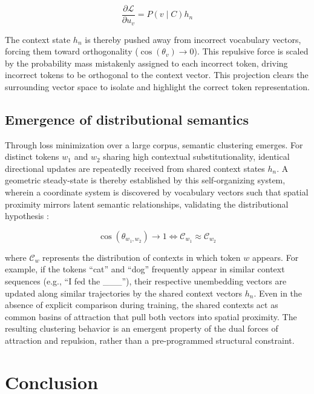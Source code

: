 \documentclass[11pt,a4paper]{article}
\begin{document}
	\begin{equation}
		\frac{\partial \mathcal{L}}{\partial u_v} = P(v \mid C) h_n
	\end{equation}
	
	The context state $h_n$ is thereby pushed away from incorrect vocabulary vectors, forcing them toward orthogonality ($\cos(\theta_v) \to 0$). This repulsive force is scaled by the probability mass mistakenly assigned to each incorrect token, driving incorrect tokens to be orthogonal to the context vector. This projection clears the surrounding vector space to isolate and highlight the correct token representation.
	
	\subsection{Emergence of distributional semantics}
	Through loss minimization over a large corpus, semantic clustering emerges. For distinct tokens $w_1$ and $w_2$ sharing high contextual substitutionality, identical directional updates are repeatedly received from shared context states $h_n$. A geometric steady-state is thereby established by this self-organizing system, wherein a coordinate system is discovered by vocabulary vectors such that spatial proximity mirrors latent semantic relationships, validating the distributional hypothesis \citep{harris_distributional_1954}:
	
	\begin{equation}
		\cos(\theta_{w_1, w_2}) \to 1 \iff \mathcal{C}_{w_1} \approx \mathcal{C}_{w_2}
	\end{equation}
	
	where $\mathcal{C}_w$ represents the distribution of contexts in which token $w$ appears. For example, if the tokens ``cat'' and ``dog'' frequently appear in similar context sequences (e.g., ``I fed the \_\_\_''), their respective unembedding vectors are updated along similar trajectories by the shared context vectors $h_n$. Even in the absence of explicit comparison during training, the shared contexts act as common basins of attraction that pull both vectors into spatial proximity. The resulting clustering behavior is an emergent property of the dual forces of attraction and repulsion, rather than a pre-programmed structural constraint.
	
	\section{Conclusion}
	
\end{document}

